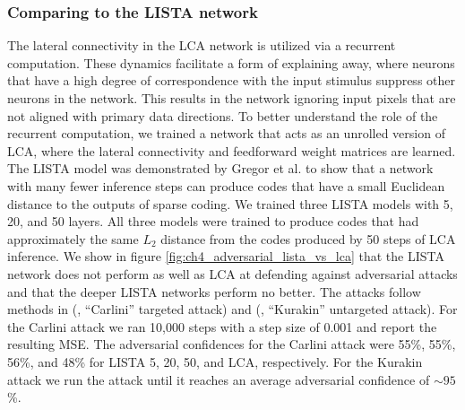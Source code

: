 \subsubsection{Comparing to the LISTA network}
The lateral connectivity in the LCA network is utilized via a recurrent computation. These dynamics facilitate a form of explaining away, where neurons that have a high degree of correspondence with the input stimulus suppress other neurons in the network. This results in the network ignoring input pixels that are not aligned with primary data directions. To better understand the role of the recurrent computation, we trained a network that acts as an unrolled version of LCA, where the lateral connectivity and feedforward weight matrices are learned. The LISTA model was demonstrated by Gregor et al. \citeyearpar{gregor2010learning} to show that a network with many fewer inference steps can produce codes that have a small Euclidean distance to the outputs of sparse coding. We trained three LISTA models with 5, 20, and 50 layers. All three models were trained to produce codes that had approximately the same $L_{2}$ distance from the codes produced by 50 steps of LCA inference. We show in figure \ref{fig:ch4_adversarial_lista_vs_lca} that the LISTA network does not perform as well as LCA at defending against adversarial attacks and that the deeper LISTA networks perform no better. The attacks follow methods in (\cite{carlini2017towards}, ``Carlini'' targeted attack) and (\cite{kurakin2016adversarial}, ``Kurakin'' untargeted attack). For the Carlini attack we ran 10,000 steps with a step size of 0.001 and report the resulting MSE. The adversarial confidences for the Carlini attack were 55\%, 55\%, 56\%, and 48\% for LISTA 5, 20, 50, and LCA, respectively. For the Kurakin attack we run the attack until it reaches an average adversarial confidence of $\sim 95$\%. 

